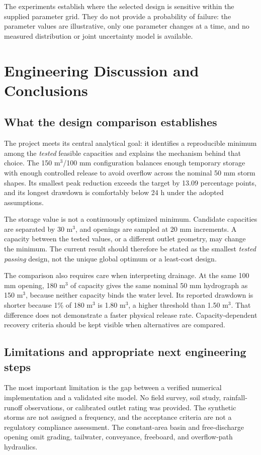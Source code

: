 \documentclass[11pt,letterpaper]{article}
\begin{document}
The experiments establish where the selected design is sensitive within
the supplied parameter grid. They do not provide a probability of failure:
the parameter values are illustrative, only one parameter changes at a time,
and no measured distribution or joint uncertainty model is available.

\section{Engineering Discussion and Conclusions}\label{sec:discussion}
\subsection{What the design comparison establishes}
The project meets its central analytical goal: it identifies a reproducible
minimum among the \emph{tested} feasible capacities and explains the mechanism
behind that choice. The 150 m$^3$/100 mm configuration balances enough
temporary storage with enough controlled release to avoid overflow across
the nominal 50 mm storm shapes. Its smallest peak reduction exceeds the
target by 13.09 percentage points, and its longest drawdown is comfortably
below 24 h under the adopted assumptions.

The storage value is not a continuously optimized minimum. Candidate
capacities are separated by 30 m$^3$, and openings are sampled at 20 mm
increments. A capacity between the tested values, or a different outlet
geometry, may change the minimum. The current result should therefore be
stated as the smallest \emph{tested passing} design, not the unique global
optimum or a least-cost design.

The comparison also requires care when interpreting drainage. At the same
100 mm opening, 180 m$^3$ of capacity gives the same nominal 50 mm hydrograph
as 150 m$^3$, because neither capacity binds the water level. Its reported
drawdown is shorter because 1\% of 180 m$^3$ is 1.80 m$^3$, a higher threshold
than 1.50 m$^3$. That difference does not demonstrate a faster physical
release rate. Capacity-dependent recovery criteria should be kept visible
when alternatives are compared.

\subsection{Limitations and appropriate next engineering steps}
The most important limitation is the gap between a verified numerical
implementation and a validated site model. No field survey, soil study,
rainfall-runoff observations, or calibrated outlet rating was provided.
The synthetic storms are not assigned a frequency, and the acceptance
criteria are not a regulatory compliance assessment. The constant-area basin
and free-discharge opening omit grading, tailwater, conveyance, freeboard,
and overflow-path hydraulics.
\end{document}
